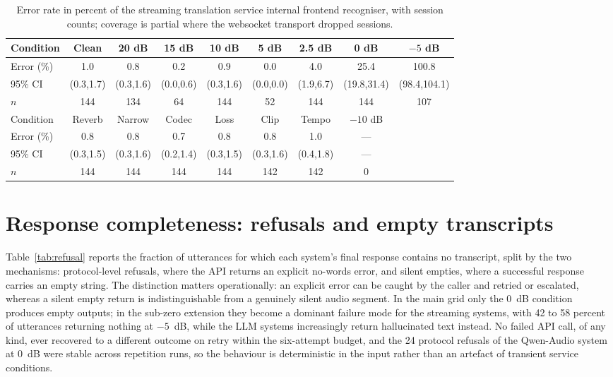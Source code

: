 \begin{table}[h]
\centering
\caption{Error rate in percent of the streaming translation service
internal frontend recogniser, with session counts; coverage is partial
where the websocket transport dropped sessions.}
\label{tab:ltfrontend}
\footnotesize
\setlength{\tabcolsep}{2.6pt}
\begin{tabular}{lcccccccc}
\toprule
Condition & Clean & 20 dB & 15 dB & 10 dB & 5 dB & 2.5 dB & 0 dB & $-5$ dB \\
\midrule
Error (\%) & 1.0 & 0.8 & 0.2 & 0.9 & 0.0 & 4.0 & 25.4 & 100.8 \\
95\% CI & (0.3,1.7) & (0.3,1.6) & (0.0,0.6) & (0.3,1.6) & (0.0,0.0) & (1.9,6.7) & (19.8,31.4) & (98.4,104.1) \\
$n$ & 144 & 134 & 64 & 144 & 52 & 144 & 144 & 107 \\
\midrule
Condition & Reverb & Narrow & Codec & Loss & Clip & Tempo & $-10$ dB & \\
\midrule
Error (\%) & 0.8 & 0.8 & 0.7 & 0.8 & 0.8 & 1.0 & --- & \\
95\% CI & (0.3,1.5) & (0.3,1.6) & (0.2,1.4) & (0.3,1.5) & (0.3,1.6) & (0.4,1.8) & --- & \\
$n$ & 144 & 144 & 144 & 144 & 142 & 142 & 0 & \\
\bottomrule
\end{tabular}
\end{table}

\section{Response completeness: refusals and empty transcripts}
\label{app:refusal}

Table~\ref{tab:refusal} reports the fraction of utterances for which each
system's final response contains no transcript, split by the two
mechanisms: protocol-level refusals, where the API returns an explicit
no-words error, and silent empties, where a successful response carries an
empty string. The distinction matters operationally: an explicit error can
be caught by the caller and retried or escalated, whereas a silent empty
return is indistinguishable from a genuinely silent audio segment. In the
main grid only the 0~dB condition produces empty outputs; in the sub-zero
extension they become a dominant failure mode for the streaming systems,
with 42 to 58 percent of utterances returning nothing at $-5$~dB, while
the LLM systems increasingly return hallucinated text instead. No failed
API call, of any kind, ever recovered to a different outcome on retry
within the six-attempt budget, and the 24 protocol refusals of the
Qwen-Audio system at 0~dB were stable across repetition runs, so the
behaviour is deterministic in the input rather than an artefact of
transient service conditions.

